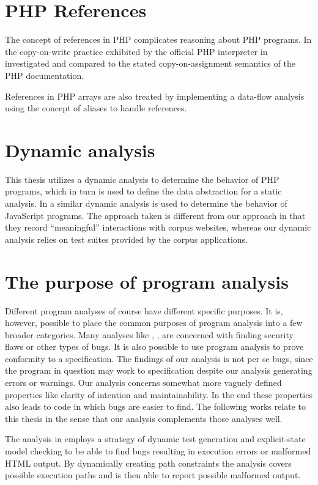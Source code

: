 \section{PHP References}
The concept of references in PHP complicates reasoning about PHP programs. In  the copy-on-write practice exhibited by the official PHP interpreter in investigated and compared to the stated copy-on-assignment semantics of the PHP documentation.

References in PHP arrays are also treated by  implementing a data-flow analysis using the concept of aliases to handle references. 

\section{Dynamic analysis}
This thesis utilizes a dynamic analysis to determine the behavior of PHP programs, which in turn is used to define the data abstraction for a static analysis. In \cite{richards10} a similar dynamic analysis is used to determine the behavior of JavaScript programs. The approach taken is different from our approach in that they record ``meaningful'' interactions with corpus websites, whereas our dynamic analysis relies on test suites provided by the corpus applications.



\section{The purpose of program analysis}
Different program analyses of course have different specific purposes. It is, however, possible to place the common purposes of program analysis into a few broader categories. Many analyses like , , are concerned with finding security flaws or other types of bugs. It is also possible to use program analysis to prove conformity to a specification. The findings of our analysis is not per se bugs, since the program in question may work to specification despite our analysis generating errors or warnings. Our analysis concerns somewhat more vaguely defined properties like clarity of intention and maintainability. In the end these properties also leads to code in which bugs are easier to find. The following works relate to this thesis in the sense that our analysis complements those analyses well.

The analysis in  employs a strategy of dynamic test generation and explicit-state model checking to be able to find bugs resulting in execution errors or malformed HTML output. By dynamically creating path constraints the analysis covers possible execution paths and is then able to report possible malformed output.

